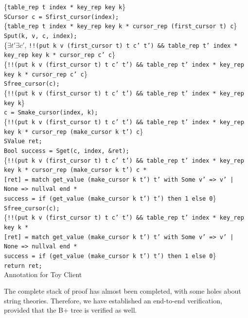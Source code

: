 \documentclass[runningheads]{llncs}
\begin{document}
\begin{listing}[htbp]
\centering
\{\texttt{table\_rep t index * key\_rep key k}\} \\
\texttt{SCursor c = Sfirst\_cursor(index);} \\
\{\texttt{table\_rep t index * key\_rep key k * cursor\_rep (first\_cursor t)
c}\} \\
\texttt{Sput(k, v, c, index);} \\
\{$\exists t'\exists c'$, \texttt{!!(put k v (first\_cursor t) t c' t') \&\& table\_rep
t' index * key\_rep key k * cursor\_rep c' c}\} \\
\{\texttt{!!(put k v (first\_cursor t) t c' t') \&\& table\_rep t' index * key\_rep key
k * cursor\_rep c' c}\} \\
\texttt{Sfree\_cursor(c);} \\
\{\texttt{!!(put k v (first\_cursor t) t c' t') \&\& table\_rep t' index * key\_rep key
k}\} \\
\texttt{c = Smake\_cursor(index, k);} \\
\{\texttt{!!(put k v (first\_cursor t) t c' t') \&\& table\_rep t' index * key\_rep key
k * cursor\_rep (make\_cursor k t') c}\} \\
\texttt{SValue ret;} \\
\texttt{Bool success = Sget(c, index, \&ret);} \\
\{\texttt{!!(put k v (first\_cursor t) t c' t') \&\& table\_rep t' index * key\_rep key
k * cursor\_rep (make\_cursor k t') c *} \\
\texttt{[ret] = match get\_value (make\_cursor k t') t' with Some v' => v' | None =>
nullval end *} \\
\texttt{success = if (get\_value (make\_cursor k t') t') then 1 else 0}\} \\
\texttt{Sfree\_cursor(c);} \\
\{\texttt{!!(put k v (first\_cursor t) t c' t') \&\& table\_rep t' index * key\_rep key
k *} \\
\texttt{[ret] = match get\_value (make\_cursor k t') t' with Some v' => v' | None =>
nullval end *} \\
\texttt{success = if (get\_value (make\_cursor k t') t') then 1 else 0}\} \\
\texttt{return ret;} \\
\caption{Annotation for Toy Client}\label{lst:annotation}
\end{listing}

The complete stack of proof has almost been completed, with some holes about
string theories. Therefore, we have established an end-to-end verification,
provided that the B+ tree is verified as well.
\end{document}
